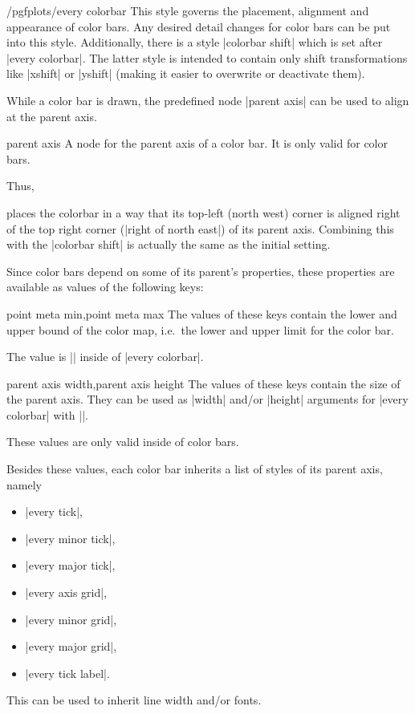 \begin{stylekey}{/pgfplots/every colorbar}
	This style governs the placement, alignment and appearance of color bars. Any desired detail changes for color bars can be put into this style. Additionally, there is a style |colorbar shift| which is set after |every colorbar|. The latter style is intended to contain only shift transformations like |xshift| or |yshift| (making it easier to overwrite or deactivate them).

	While a color bar is drawn, the predefined node |parent axis| can be used to align at the parent axis.
\begin{predefinednode}{parent axis}
	A node for the parent axis of a color bar. It is only valid for color bars.
\end{predefinednode}

	Thus, 
\begin{codeexample}
\end{codeexample}
	\noindent places the colorbar in a way that its top-left (north west) corner is aligned right of the top right corner (|right of north east|) of its parent axis. Combining this with the |colorbar shift| is actually the same as the initial setting.

	Since color bars depend on some of its parent's properties, these properties are available as values of the following keys:
\begin{pgfplotskeylist}{point meta min,point meta max}
	The values of these keys contain the lower and upper bound of the color map, i.e.\ the lower and upper limit for the color bar. 
	
	The value is || inside of |every colorbar|.
\end{pgfplotskeylist}
\begin{pgfplotskeylist}{parent axis width,parent axis height}
	The values of these keys contain the size of the parent axis. They can be used as |width| and/or |height| arguments for |every colorbar| with ||.

	These values are only valid inside of color bars.
\end{pgfplotskeylist}

	Besides these values, each color bar inherits a list of styles of its parent axis, namely

	\begin{itemize}
		\item |every tick|,
		\item |every minor tick|,
		\item |every major tick|,
		\item |every axis grid|,
		\item |every minor grid|,
		\item |every major grid|,
		\item |every tick label|.
	\end{itemize}
	This can be used to inherit line width and/or fonts.


\end{stylekey}
